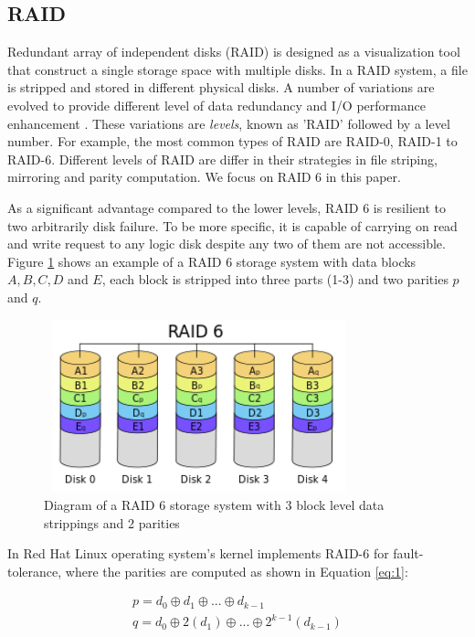 \subsection{RAID}
Redundant array of independent disks (RAID) is designed as a visualization tool that construct a single storage space with multiple disks. In a RAID system, a file is stripped and stored in different physical disks. A number of variations are evolved to provide different level of data redundancy and I/O performance enhancement \cite{arpaci2012operating}. These variations are \textit{levels}, known as 'RAID' followed by a level number. For example, the most common types of RAID are RAID-0, RAID-1 to RAID-6. Different levels of RAID are differ in their strategies in file striping, mirroring and parity computation. We focus on RAID 6 in this paper.

As a significant advantage compared to the lower levels, RAID 6 is resilient to two arbitrarily disk failure. To be more specific, it is capable of carrying on read and write request to any logic disk despite any two of them are not accessible. Figure \ref{fig:raid6} shows an example of a RAID 6 storage system with data blocks $A, B, C, D$ and $E$, each block is stripped into three parts (1-3) and two parities $p$ and $q$. 

\begin{figure}[t]
	\includegraphics[width=9cm,height=5cm,angle=0]{RAID6.png}
	\caption{Diagram of a RAID 6 storage system with 3 block level data strippings and 2 parities \cite{wiki:raid} }
	\label{fig:raid6}
\end{figure}

In Red Hat Linux operating system's kernel implements RAID-6 for fault-tolerance, where the parities are computed as shown in Equation \ref{eq:1}:

\begin{equation} \label{eq:1}
\begin{array}{lcr} p = d_0 \oplus d_1 \oplus ... \oplus d_{k-1} \\
q = d_0 \oplus 2(d_1) \oplus ... \oplus 2^{k-1}(d_{k-1}) 
\end{array}
\end{equation}



